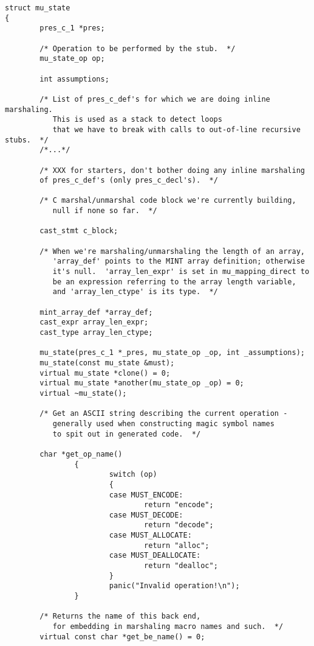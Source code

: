 \begin{verbatim}
struct mu_state
{
        pres_c_1 *pres;

        /* Operation to be performed by the stub.  */
        mu_state_op op;

        int assumptions;

        /* List of pres_c_def's for which we are doing inline marshaling.
           This is used as a stack to detect loops
           that we have to break with calls to out-of-line recursive stubs.  */
        /*...*/

        /* XXX for starters, don't bother doing any inline marshaling
        of pres_c_def's (only pres_c_decl's).  */

        /* C marshal/unmarshal code block we're currently building,
           null if none so far.  */

        cast_stmt c_block;

        /* When we're marshaling/unmarshaling the length of an array,
           'array_def' points to the MINT array definition; otherwise
           it's null.  'array_len_expr' is set in mu_mapping_direct to
           be an expression referring to the array length variable,
           and 'array_len_ctype' is its type.  */

        mint_array_def *array_def;
        cast_expr array_len_expr;
        cast_type array_len_ctype;

        mu_state(pres_c_1 *_pres, mu_state_op _op, int _assumptions);
        mu_state(const mu_state &must);
        virtual mu_state *clone() = 0;
        virtual mu_state *another(mu_state_op _op) = 0;
        virtual ~mu_state();

        /* Get an ASCII string describing the current operation -
           generally used when constructing magic symbol names
           to spit out in generated code.  */

        char *get_op_name()
                {
                        switch (op)
                        {
                        case MUST_ENCODE:
                                return "encode";
                        case MUST_DECODE:
                                return "decode";
                        case MUST_ALLOCATE:
                                return "alloc";
                        case MUST_DEALLOCATE:
                                return "dealloc";
                        }
                        panic("Invalid operation!\n");
                }

        /* Returns the name of this back end,
           for embedding in marshaling macro names and such.  */
        virtual const char *get_be_name() = 0;


\end{verbatim}
